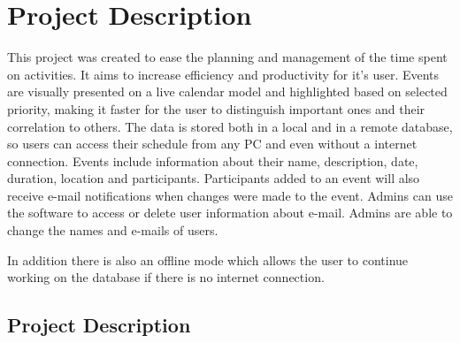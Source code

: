 \chapter{\centering Project Description} %

\label{Chapter Project Description} %

This project was created to ease the planning and management of the time spent on activities. It aims to 
increase efficiency and productivity for it's user. Events are visually presented on a live calendar model and 
highlighted based on selected priority, making it faster for the user to distinguish important ones and their 
correlation to others. The data is stored both in a local and in a remote database, so users can access their 
schedule from any PC and even without a internet connection. Events include information about their name, 
description, date, duration, location and participants. Participants added to an event will also receive 
e-mail notifications when changes were made to the event. Admins can use the software to access or delete user
information about e-mail. Admins are able to change the names and e-mails of users.

In addition there is also an offline mode which allows the user to continue working on the database if there is no 
internet connection.

\section{Project Description}

